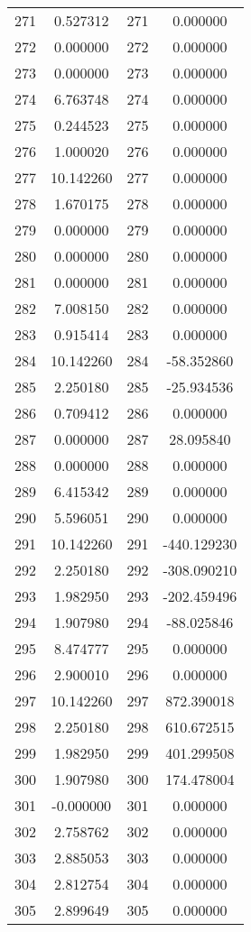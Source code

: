 \documentclass[12pt]{article}
\begin{document}
\begin{longtable}{@{}cccc@{}}
271 & 0.527312 & 271 & 0.000000 \\
272 & 0.000000 & 272 & 0.000000 \\
273 & 0.000000 & 273 & 0.000000 \\
274 & 6.763748 & 274 & 0.000000 \\
275 & 0.244523 & 275 & 0.000000 \\
276 & 1.000020 & 276 & 0.000000 \\
277 & 10.142260 & 277 & 0.000000 \\
278 & 1.670175 & 278 & 0.000000 \\
279 & 0.000000 & 279 & 0.000000 \\
280 & 0.000000 & 280 & 0.000000 \\
281 & 0.000000 & 281 & 0.000000 \\
282 & 7.008150 & 282 & 0.000000 \\
283 & 0.915414 & 283 & 0.000000 \\
284 & 10.142260 & 284 & -58.352860 \\
285 & 2.250180 & 285 & -25.934536 \\
286 & 0.709412 & 286 & 0.000000 \\
287 & 0.000000 & 287 & 28.095840 \\
288 & 0.000000 & 288 & 0.000000 \\
289 & 6.415342 & 289 & 0.000000 \\
290 & 5.596051 & 290 & 0.000000 \\
291 & 10.142260 & 291 & -440.129230 \\
292 & 2.250180 & 292 & -308.090210 \\
293 & 1.982950 & 293 & -202.459496 \\
294 & 1.907980 & 294 & -88.025846 \\
295 & 8.474777 & 295 & 0.000000 \\
296 & 2.900010 & 296 & 0.000000 \\
297 & 10.142260 & 297 & 872.390018 \\
298 & 2.250180 & 298 & 610.672515 \\
299 & 1.982950 & 299 & 401.299508 \\
300 & 1.907980 & 300 & 174.478004 \\
301 & -0.000000 & 301 & 0.000000 \\
302 & 2.758762 & 302 & 0.000000 \\
303 & 2.885053 & 303 & 0.000000 \\
304 & 2.812754 & 304 & 0.000000 \\
305 & 2.899649 & 305 & 0.000000 \\

\end{longtable}
\end{document}
